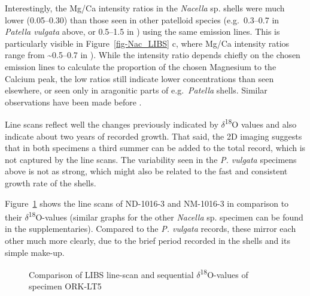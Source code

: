 \documentclass[
  authoryear,
  preprint,
  3p]{elsarticle}
\begin{document}
Interestingly, the Mg/Ca intensity ratios in the \emph{Nacella} sp.
shells were much lower (0.05--0.30) than those seen in other patelloid
species (e.g.~0.3--0.7 in \emph{Patella vulgata} above, or 0.5--1.5 in )
using the same emission lines. This is particularly visible in
Figure~\ref{fig-Nac_LIBS} c, where Mg/Ca intensity ratios range from
\textasciitilde0.5--0.7 in \citep{Hausmann2023-ih}). While the intensity
ratio depends chiefly on the chosen emission lines to calculate the
proportion of the chosen Magnesium to the Calcium peak, the low ratios
still indicate lower concentrations than seen elsewhere, or seen only in
aragonitic parts of e.g.~\emph{Patella} shells. Similar observations
have been made before \citep{Graniero2017-io}.

Line scans reflect well the changes previously indicated by
\(\delta\)\textsuperscript{18}O values and also indicate about two years
of recorded growth. That said, the 2D imaging suggests that in both
specimens a third summer can be added to the total record, which is not
captured by the line scans. The variability seen in the \emph{P.
vulgata} specimens above is not as strong, which might also be related
to the fast and consistent growth rate of the shells.

Figure~\ref{fig-Nac_Comp} shows the line scans of ND-1016-3 and
NM-1016-3 in comparison to their \(\delta\)\textsuperscript{18}O-values
(similar graphs for the other \emph{Nacella} sp. specimen can be found
in the supplementaries). Compared to the \emph{P. vulgata} records,
these mirror each other much more clearly, due to the brief period
recorded in the shells and its simple make-up.

\begin{figure}


\caption{\label{fig-Nac_Comp}Comparison of LIBS line-scan and sequential
\(\delta\)\textsuperscript{18}O-values of specimen ORK-LT5}

\end{figure}%
\end{document}
